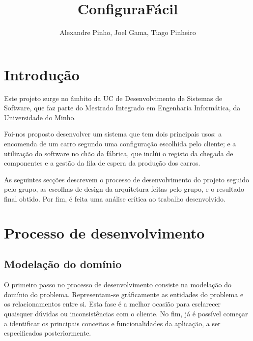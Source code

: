 \documentclass{llncs}
\begin{document}
\title{ConfiguraFácil}
\author{Alexandre Pinho, Joel Gama, Tiago Pinheiro}


\maketitle

\clearpage

\section{Introdução}

Este projeto surge no âmbito da UC de Desenvolvimento de Sistemas de Software, que faz parte do Mestrado Integrado em Engenharia Informática, da Universidade do Minho.

Foi-nos proposto desenvolver um sistema que tem dois principais usos: a encomenda de um carro segundo uma configuração escolhida pelo cliente; e a utilização do software no chão da fábrica, que inclúi o registo da chegada de componentes e a gestão da fila de espera da produção dos carros. 

As seguintes secções descrevem o processo de desenvolvimento do projeto seguido pelo grupo, as escolhas de design da arquitetura feitas pelo grupo, e o resultado final obtido. Por fim, é feita uma análise crítica ao trabalho desenvolvido.

\clearpage
\section{Processo de desenvolvimento}


\subsection{Modelação do domínio}

O primeiro passo no processo de desenvolvimento consiste na modelação do domínio do problema. Representam-se gráficamente as entidades do problema e os relacionamentos entre si. Esta fase é a melhor ocasião para esclarecer quaisquer dúvidas ou inconsistências com o cliente. No fim, já é possível começar a identificar os principais conceitos e funcionalidades da aplicação, a ser especificados posteriormente.
\end{document}
